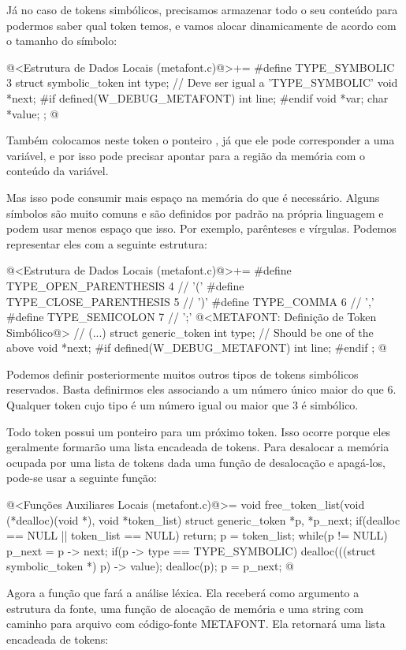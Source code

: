 Já no caso de tokens simbólicos, precisamos armazenar todo o seu
conteúdo para podermos saber qual token temos, e vamos alocar
dinamicamente de acordo com o tamanho do símbolo:

\iniciocodigo
@<Estrutura de Dados Locais (metafont.c)@>+=
#define TYPE_SYMBOLIC 3
struct symbolic_token{
  int type;   // Deve ser igual a 'TYPE_SYMBOLIC'
  void *next;
#if defined(W_DEBUG_METAFONT)
  int line;
#endif
  void *var;
  char *value;
};
@
\fimcodigo

Também colocamos neste token o ponteiro , já que ele
pode corresponder a uma variável, e por isso pode precisar apontar
para a região da memória com o conteúdo da variável.

Mas isso pode consumir mais espaço na memória do que é
necessário. Alguns símbolos são muito comuns e são definidos por
padrão na própria linguagem e podem usar menos espaço que isso. Por
exemplo, parênteses e vírgulas. Podemos representar eles com a
seguinte estrutura:

\iniciocodigo
@<Estrutura de Dados Locais (metafont.c)@>+=
#define TYPE_OPEN_PARENTHESIS  4 // '('
#define TYPE_CLOSE_PARENTHESIS 5 // ')'
#define TYPE_COMMA             6 // ','
#define TYPE_SEMICOLON         7 // ';'
@<METAFONT: Definição de Token Simbólico@>
// (...)
struct generic_token{
  int type;   // Should be one of the above
  void *next;
#if defined(W_DEBUG_METAFONT)
  int line;
#endif
};
@
\fimcodigo

Podemos definir posteriormente muitos outros tipos de tokens
simbólicos reservados. Basta definirmos eles associando a um número
único maior do que 6. Qualquer token cujo tipo é um número igual ou
maior que 3 é simbólico.

Todo token possui um ponteiro para um próximo token. Isso ocorre
porque eles geralmente formarão uma lista encadeada de tokens. Para
desalocar a memória ocupada por uma lista de tokens dada uma função de
desalocação e apagá-los, pode-se usar a seguinte função:

\iniciocodigo
@<Funções Auxiliares Locais (metafont.c)@>=
void free_token_list(void (*dealloc)(void *), void *token_list){
  struct generic_token *p, *p_next;
  if(dealloc == NULL || token_list == NULL)
    return;
  p = token_list;
  while(p != NULL){
    p_next = p -> next;
    if(p -> type == TYPE_SYMBOLIC)
      dealloc(((struct symbolic_token *) p) -> value);
    dealloc(p);
    p = p_next;
  }
}
@
\fimcodigo

Agora a função que fará a análise léxica. Ela receberá como argumento
a estrutura da fonte, uma função de alocação de memória e uma string
com caminho para arquivo com código-fonte METAFONT. Ela retornará uma
lista encadeada de tokens:

